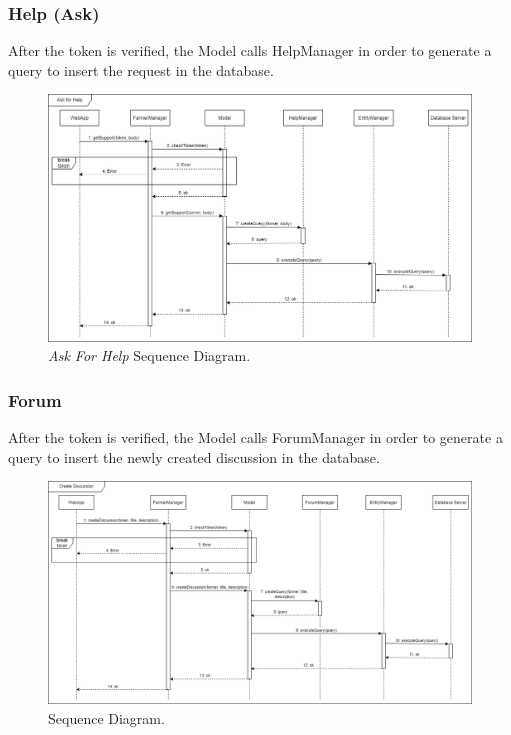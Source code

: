 \subsubsection{Help (Ask)}
After the token is verified, the Model calls HelpManager in order to generate a query to insert the request in the database.
\begin{figure}[H]
    \centering
    \includegraphics[width=\textwidth]{Images/Sequence Diagram/AskForHelp.png}
    \caption{\textit{Ask For Help} Sequence Diagram.}
\end{figure}
\subsubsection{Forum}
After the token is verified, the Model calls ForumManager in order to generate a query to insert the newly created discussion in the database.
\begin{figure}[H]
    \centering
    \includegraphics[width=\textwidth]{Images/Sequence Diagram/Forum.png}
    \caption{\textit{} Sequence Diagram.}
\end{figure}
